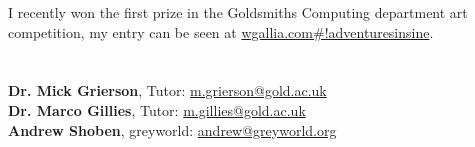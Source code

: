\documentclass[margin,line,a4paper]{resume}
\begin{document}
\begin{resume}
I recently won the first prize in the Goldsmiths Computing department art competition, my entry can be seen at \href{http://wgallia.com#!adventuresinsine}{wgallia.com\#!adventuresinsine}. 

\section{}

\hypersetup{urlcolor=Fuchsia}
%
\textbf{Dr. Mick Grierson}, Tutor: \href{mailto:m.grierson@gold.ac.uk}{m.grierson@gold.ac.uk}
\vspace{2mm} \\
\textbf{Dr. Marco Gillies}, Tutor: \href{mailto:m.gillies@gold.ac.uk}{m.gillies@gold.ac.uk}
\vspace{2mm} \\
\textbf{Andrew Shoben}, greyworld: \href{mailto:andrew@greyworld.org}{andrew@greyworld.org}
\vspace{2mm} \\



\end{resume}
\end{document}
